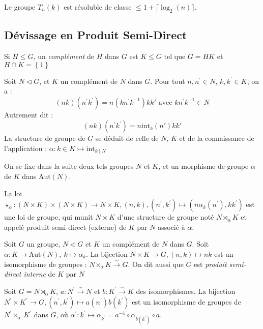 \documentclass{cours}
\begin{document}
\begin{proposition}
    Le groupe $T_{n}(k)$ est résoluble de classe $\leq 1 + \lceil \log_{2}(n) \rceil$.
\end{proposition}

\subsection{Dévissage en Produit Semi-Direct}
\begin{definition}
    Si $H \leq G$, un \emph{complément} de $H$ dans $G$ est $K\leq G$ tel que $G = HK$ et $H \cap K = \left\{1\right\}$
\end{definition}

\begin{remark}
    Soit $N \lhd G$, et $K$ un complément de $N$ dans $G$. Pour tout $n, n^{'} \in N$, $k, k^{'} \in K$, on a :
    \[
        (nk)(n^{'}k^{'}) = n(kn^{'}k^{-1})kk' \text{ avec } kn^{'}k^{-1} \in N
    \]
    Autrement dit :
    \[
        (nk)(n^{'}k^{'}) = n\text{int}_{k}(n')kk'
    \]
    La structure de groupe de $G$ se déduit de celle de $N$, $K$ et de la connaissance de l'application : $\alpha : k \in K \mapsto \text{int}_{k\mid N}$
\end{remark}

On se fixe dans la suite deux tels groupes $N$ et $K$, et un morphisme de groupe $\alpha$ de $K$ dans $\text{Aut}(N)$.

\begin{definition}
    La loi $\star_{\alpha} : (N \times K) \times (N \times K) \rightarrow N \times K, (n, k), (n^{'}, k^{'}) \mapsto (n\alpha_{k}(n^{'}), kk^{'})$ est une loi de groupe, qui munit $N \times K$ d'une structure de groupe noté $N \rtimes_{\alpha} K$ et appelé produit semi-direct (externe) de $K$ par $N$ associé à $\alpha$.
\end{definition}

\begin{proposition}
    Soit $G$ un groupe, $N \lhd G$ et $K$ un complément de $N$ dans $G$. Soit $\alpha : K \rightarrow \text{Aut}(N),\ k \mapsto \alpha_{k}$. La bijection $N \times K \rightarrow G, (n, k) \mapsto nk$ est un isomorphisme de groupes : $N \rtimes_{\alpha} K \xrightarrow{\sim} G$. On dit aussi que $G$ est \emph{produit semi-direct interne} de $K$ par $N$
\end{proposition}

\begin{proposition}
    Soit $G = N \rtimes_{\alpha} K$, $a : N^{'} \xrightarrow{\sim} N$ et $b : K^{'} \xrightarrow{\sim} K$ des isomorphismes. La bijection $N^{'}\times K^{'} \rightarrow G, (n^{'}, k^{'}) \mapsto a(n^{'})b(k^{'})$ est un isomorphisme de groupes de $N^{'} \rtimes_{\alpha^{'}} K^{'}$ dans $G$, où $\alpha^{'} : k^{'} \mapsto \alpha_{k^{'}} = a^{-1}\circ \alpha_{b(k^{'})} \circ a$.
\end{proposition}
\end{document}
